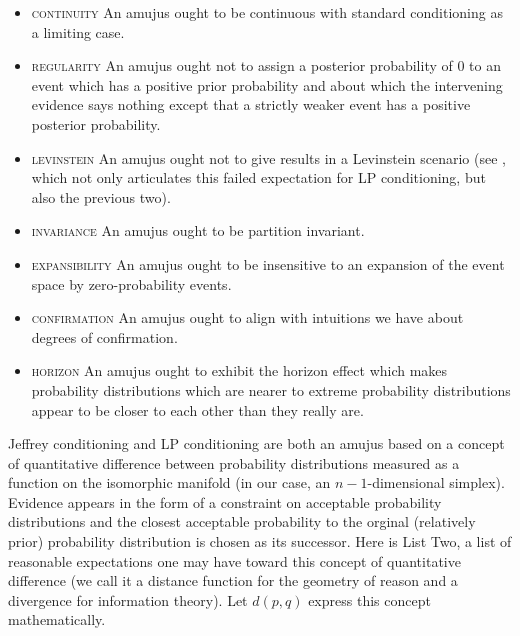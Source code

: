 \documentclass[11pt]{article}
\begin{document}
\begin{itemize}
\item \textsc{continuity} An amujus ought to be continuous with
  standard conditioning as a limiting case.
\item \textsc{regularity} An amujus ought not to assign a posterior
  probability of $0$ to an event which has a positive prior
  probability and about which the intervening evidence says nothing
  except that a strictly weaker event has a positive posterior
  probability.
\item \textsc{levinstein} An amujus ought not to give  results in a Levinstein scenario (see
  , which not only articulates this failed
  expectation for LP conditioning, but also the previous two).
\item \textsc{invariance} An amujus ought to be partition invariant.
\item \textsc{expansibility} An amujus ought to be insensitive to an
  expansion of the event space by zero-probability events.
\item \textsc{confirmation} An amujus ought to align with intuitions
  we have about degrees of confirmation.
\item \textsc{horizon} An amujus ought to exhibit the horizon effect
  which makes probability distributions which are nearer to extreme
  probability distributions appear to be closer to each other than
  they really are.
\end{itemize}

Jeffrey conditioning and LP conditioning are both an amujus based on a
concept of quantitative difference between probability distributions
measured as a function on the isomorphic manifold (in our case, an
$n-1$-dimensional simplex). Evidence appears in the form of a
constraint on acceptable probability distributions and the closest
acceptable probability to the orginal (relatively prior) probability
distribution is chosen as its successor. Here is List
Two\label{page:listtwo}, a list of reasonable expectations one may
have toward this concept of quantitative difference (we call it a
distance function for the geometry of reason and a divergence for
information theory). Let $d(p,q)$ express this concept mathematically.
\end{document}
